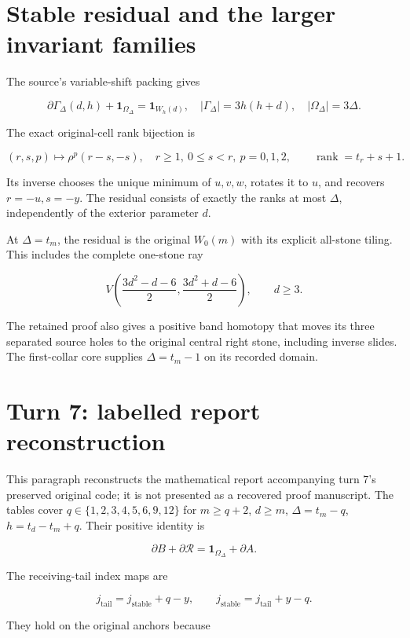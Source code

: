 \documentclass[
  10pt,
]{scrreprt}
\begin{document}
\section{Stable residual and the larger invariant
families}\label{stable-residual-and-the-larger-invariant-families}

The source's variable-shift packing gives

\[\partial\Gamma_\Delta(d,h)+\mathbf1_{\Omega_\Delta}=\mathbf1_{W_h(d)},
\quad|\Gamma_\Delta|=3h(h+d),\quad|\Omega_\Delta|=3\Delta.\]

The exact original-cell rank bijection is

\[(r,s,p)\mapsto\rho^p(r-s,-s),\quad r\ge1,\ 0\le s<r,\ p=0,1,2,
\qquad\operatorname{rank}=t_r+s+1.\]

Its inverse chooses the unique minimum of \(u,v,w\), rotates it to
\(u\), and recovers \(r=-u,s=-y\). The residual consists of exactly the
ranks at most \(\Delta\), independently of the exterior parameter \(d\).

At \(\Delta=t_m\), the residual is the original \(W_0(m)\) with its
explicit all-stone tiling. This includes the complete one-stone ray

\[V\left(\frac{3d^2-d-6}{2},\frac{3d^2+d-6}{2}\right),\qquad d\ge3.\]

The retained proof also gives a positive band homotopy that moves its
three separated source holes to the original central right stone,
including inverse slides. The first-collar core supplies
\(\Delta=t_m-1\) on its recorded domain.

\section{Turn 7: labelled report
reconstruction}\label{turn-7-labelled-report-reconstruction}

This paragraph reconstructs the mathematical report accompanying turn
7's preserved original code; it is not presented as a recovered proof
manuscript. The tables cover \(q\in\{1,2,3,4,5,6,9,12\}\) for
\(m\ge q+2\), \(d\ge m\), \(\Delta=t_m-q\), \(h=t_d-t_m+q\). Their
positive identity is

\[\partial B+\partial\mathcal R=\mathbf1_{\Omega_\Delta}+\partial A.\]

The receiving-tail index maps are

\[j_{\mathrm{tail}}=j_{\mathrm{stable}}+q-y,\qquad j_{\mathrm{stable}}=j_{\mathrm{tail}}+y-q.\]

They hold on the original anchors because
\end{document}
